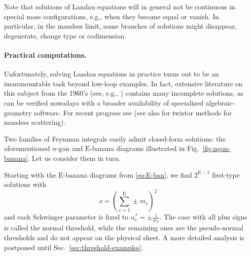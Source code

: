 \documentclass[12pt]{article}
\numberwithin{figure}{section}
\def \be {\begin{equation}}
\def \ee {\end{equation}}
\def \E {\mathrm{E}}
\begin{document}
    Note that solutions of Landau equations will in general not be continuous in special mass configurations, e.g., when they become equal or vanish. In particular, in the massless limit, some branches of solutions might disappear, degenerate, change type or codimension.
    
    \paragraph{Practical computations.}
    Unfortunately, solving Landau equations in practice turns out to be an insurmountable task beyond low-loop examples. In fact, extensive literature on this subject from the 1960's (see, e.g., \cite{Eden:1966dnq,todorov2014analytic,doi:10.1063/1.1703752,kolkunov1961b,kolkunov1961a,kolkunov1961positions,petrina,doi:10.1063/1.1705071,doi:10.1063/1.1704978}) contains many incomplete solutions, as can be verified nowadays with a broader availability of specialized algebraic-geometry software. For recent progress see \cite{Brown:2009ta,Muhlbauer:2020kut,Mizera:2021icv,Klausen:2021yrt,Correia:2021etg} (see also  \cite{Dennen:2015bet,Dennen:2016mdk,Prlina:2017azl,Prlina:2017tvx,Prlina:2018ukf,Gurdogan:2020tip} for twistor methods for massless scattering).
    
    Two families of Feynman integrals easily admit closed-form solutions: the aforementioned $n$-gon and $\E$-banana diagrams illustrated in Fig.~\ref{fig:ngon-banana}. Let us consider them in turn.
    
    Starting with the $\E$-banana diagrams from \eqref{eq:E-ban},  we find $2^{\E-1}$ first-type solutions with
    \be
    s = \left( \textstyle{\sum}_{e=1}^{\E} \pm\! m_e \right)^2
    \ee
    and each Schwinger parameter is fixed to $\alpha_e^\ast = \pm\frac{1}{m_e}$. The case with all plus signs is called the normal threshold, while the remaining ones are the pseudo-normal thresholds and do not appear on the physical sheet. A more detailed analysis is postponed until Sec.~\ref{sec:threshold-examples}.
    
\end{document}
